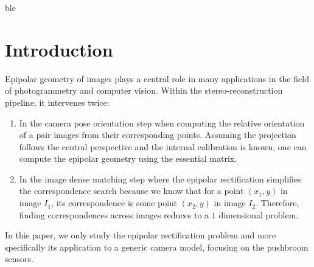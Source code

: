 \documentclass{ipol}
\begin{document}
\begin{ipolAbstract}
ble
\end{ipolAbstract}


\section{Introduction}
Epipolar geometry of images plays a central role in many applications in the field of photogrammetry and computer vision. Within the stereo-reconstruction pipeline, it intervenes twice:

\begin{enumerate}
   \item In the camera pose orientation step when computing the
      relative orientation of a pair images from their corresponding points. Assuming the projection follows the central perspective and the internal calibration is known, one can compute the epipolar geometry using the essential matrix.
   \item In the image dense matching step where the epipolar rectification simplifies the correspondence search because we know
        that for a point $(x_1,y)$ in image $I_1$, its correspondence is some point
        $(x_2,y)$ in image $I_2$. Therefore, finding correspondences across images reduces to a $1$ dimensional problem.
\end{enumerate}

\noindent In this paper, we only study  the epipolar rectification problem and more specifically
its application to a generic camera model, focusing on the pushbroom sensors.
\end{document}

